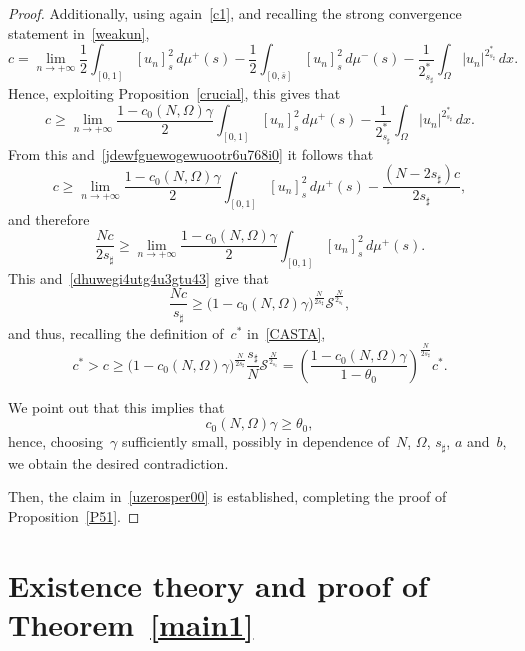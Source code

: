 \documentclass[12pt,a4paper,intlimits,sumlimits]{amsart}
\newcommand{\half}{\frac{1}{2}}
\theoremstyle{definition}
\theoremstyle{plain}
\numberwithin{equation}{section}
\renewcommand{\ge}{\geqslant}
\begin{document}
\begin{proof}
Additionally, using again~\eqref{c1}, and recalling the strong convergence
statement in~\eqref{weakun},
\begin{equation*}c=
\lim_{n\to+\infty}\half  \int_{[{{ 0 }}, 1]} [u_n]^2_{s}\, d\mu^+ (s)
-\half\int_{[{{ 0 }}, \overline s]} [u_n]^2_s \, d\mu^-(s)- \frac{1}{2_{s_\sharp}^*} \int_\Omega |u_n|^{2_{s_\sharp}^*}\, dx.
\end{equation*}
Hence, exploiting Proposition~\ref{crucial}, this gives that
\begin{equation*}c\ge
\lim_{n\to+\infty}\frac{1-c_0(N,\Omega)\gamma}2
\int_{[{{ 0 }}, 1]} [u_n]^2_{s}\, d\mu^+ (s)
- \frac{1}{2_{s_\sharp}^*} \int_\Omega |u_n|^{2_{s_\sharp}^*}\, dx.
\end{equation*}
{F}rom this and~\eqref{jdewfguewogewuootr6u768i0} it follows that
\begin{equation*}c\ge
\lim_{n\to+\infty}\frac{1-c_0(N,\Omega)\gamma}2
\int_{[{{ 0 }}, 1]} [u_n]^2_{s}\, d\mu^+ (s)
- \frac{(N-2s_\sharp)c}{2{s_\sharp}},
\end{equation*}
and therefore
\begin{equation*}\frac{Nc}{2s_\sharp}\ge
\lim_{n\to+\infty}\frac{1-c_0(N,\Omega)\gamma}2
\int_{[{{ 0 }}, 1]} [u_n]^2_{s}\, d\mu^+ (s).
\end{equation*}
This and~\eqref{dhuwegi4utg4u3gtu43} give that
\begin{equation*}\frac{Nc}{s_\sharp}\ge
\big(1-c_0(N,\Omega)\gamma\big)^{\frac{N}{2s_\sharp}}
\mathcal{S}^{\frac{N}{2_{s_\sharp}}},
\end{equation*}
and thus, recalling the definition of~$c^\ast$ in~\eqref{CASTA},
\begin{equation*}c^\ast>c\ge
\big(1-c_0(N,\Omega)\gamma\big)^{\frac{N}{2s_\sharp}}\frac{s_\sharp}{N}
\mathcal{S}^{\frac{N}{2_{s_\sharp}}}
=\left(\frac{1-c_0(N,\Omega)\gamma}{1-\theta_0}\right)^{\frac{N}{2s_\sharp}} c^\ast.
\end{equation*}

We point out that this implies that
$$ c_0(N,\Omega)\gamma\ge \theta_0,$$
hence, choosing~$\gamma$ sufficiently small, possibly in dependence of~$N$, $\Omega$, $s_\sharp$, $a$ and~$b$,
we obtain the desired contradiction.

Then, the claim in~\eqref{uzerosper00} is established, completing the
proof of Proposition~\ref{P51}.
\end{proof}

\section{Existence theory and proof of Theorem~\ref{main1}}\label{sec_main1}
\end{document}
